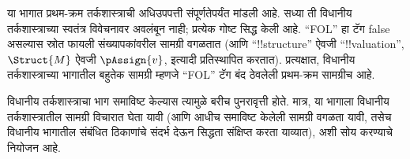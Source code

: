 \documentclass[../../include/open-logic-part]{subfiles}
\begin{document}

\begin{editorial}
  या भागात प्रथम-क्रम तर्कशास्त्राची अधिउपपत्ती संपूर्णतेपर्यंत मांडली
  आहे. सध्या ती विधानीय तर्कशास्त्राच्या स्वतंत्र विवेचनावर अवलंबून
  नाही; प्रत्येक गोष्ट सिद्ध केली आहे. ``FOL'' हा टॅग false असल्यास
  स्रोत फायली संख्यापकांवरील सामग्री वगळतात (आणि
  ``!!{structure}'' ऐवजी ``!!{valuation}'', $\Struct{M}$ ऐवजी
  $\pAssign{v}$, इत्यादी प्रतिस्थापित करतात). प्रत्यक्षात, विधानीय
  तर्कशास्त्राच्या भागातील बहुतेक सामग्री म्हणजे ``FOL'' टॅग बंद
  ठेवलेली प्रथम-क्रम सामग्रीच आहे.

  विधानीय तर्कशास्त्राचा भाग समाविष्ट केल्यास त्यामुळे बरीच
  पुनरावृत्ती होते. मात्र, या भागाला विधानीय तर्कशास्त्रातील सामग्री
  विचारात घेता यावी (आणि आधीच समाविष्ट केलेली सामग्री वगळता यावी,
  तसेच विधानीय भागातील संबंधित ठिकाणांचे संदर्भ देऊन सिद्धता
  संक्षिप्त करता याव्यात), अशी सोय करण्याचे नियोजन आहे.
\end{editorial}












\OLEndPartHook
\end{document}
